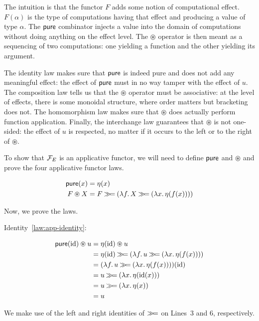 The intuition is that the functor $F$ adds some notion of computational
effect. $F(\alpha)$ is the type of computations having that effect and
producing a value of type $\alpha$. The $\mathsf{pure}$ combinator injects a value
into the domain of computations without doing anything on the effect
level. The $\circledast$ operator is then meant as a sequencing of two
computations: one yielding a function and the other yielding its argument.

The identity law makes sure that $\mathsf{pure}$ is indeed pure and does not add
any meaningful effect: the effect of $\mathsf{pure}$ must in no way tamper with the
effect of $u$. The composition law tells us that the $\circledast$ operator
must be associative: at the level of effects, there is some monoidal
structure, where order matters but bracketing does not. The homomorphism
law makes sure that $\circledast$ does actually perform function
application. Finally, the interchange law guarantees that $\circledast$ is
not one-sided: the effect of $u$ is respected, no matter if it occurs to
the left or to the right of $\circledast$.

To show that $\mathcal{F}_E$ is an applicative functor, we will need to define
$\mathsf{pure}$ and $\circledast$ and prove the four applicative functor laws.

\begin{align*}
  \mathsf{pure}(x) &= \eta(x) \\
  F \circledast X &= F \mathbin{\gg\!=} (\lambda f.\, X \mathbin{\gg\!=} (\lambda x.\, \eta(f(x))))
\end{align*}

Now, we prove the laws.

Identity~\eqref{law:app-identity}:

\setcounter{TemporaryCounter}{\value{equation}}
\setcounter{equation}{0}
\NoChapterPrefix
\begin{align}
  \mathsf{pure}(\mathrm{id}) \circledast u
  &= \eta(\mathrm{id}) \circledast u \\
  &= \eta(\mathrm{id}) \mathbin{\gg\!=} (\lambda f.\, u \mathbin{\gg\!=} (\lambda x.\, \eta(f(x)))) \\
  &= (\lambda f.\, u \mathbin{\gg\!=} (\lambda x.\, \eta(f(x))))(\mathrm{id}) \\
  &= u \mathbin{\gg\!=} (\lambda x.\, \eta(\mathrm{id}(x))) \\
  &= u \mathbin{\gg\!=} (\lambda x.\, \eta(x)) \\
  &= u
\end{align}
\setcounter{equation}{\value{TemporaryCounter}}
\ChapterPrefix

We make use of the left and right identities of $\mathbin{\gg\!=}$ on Lines~3 and 6,
respectively.

